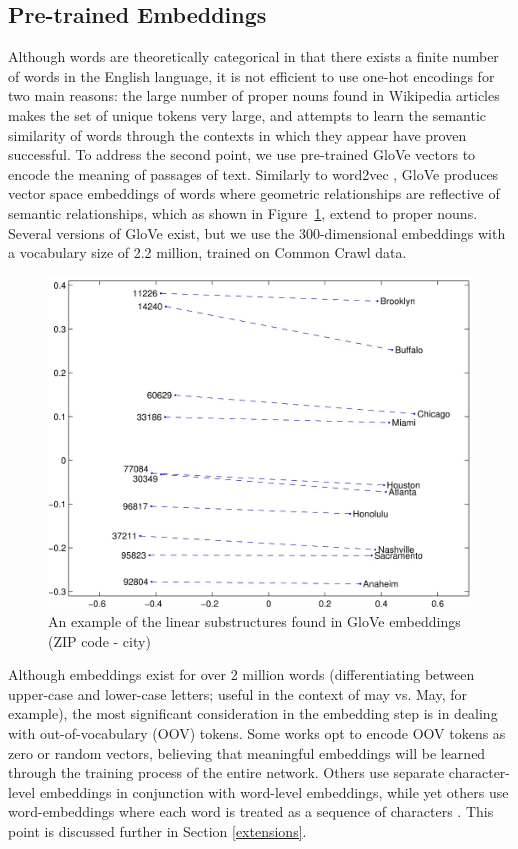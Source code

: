 \documentclass{article}
\begin{document}
\subsection{Pre-trained Embeddings}
Although words are theoretically categorical in that there exists a finite number of words in the English language, it is not efficient to use one-hot encodings for two main reasons: the large number of proper nouns found in Wikipedia articles makes the set of unique tokens very large, and attempts to learn the semantic similarity of words through the contexts in which they appear have proven successful. To address the second point, we use pre-trained GloVe \cite{GloVe} vectors to encode the meaning of passages of text. Similarly to word2vec \cite{word2vec}, GloVe produces vector space embeddings of words where geometric relationships are reflective of semantic relationships, which as shown in Figure~\ref{fig:gloveExample}, extend to proper nouns. Several versions of GloVe exist, but we use the 300-dimensional embeddings with a vocabulary size of 2.2 million, trained on Common Crawl data.

\begin{figure}[h]
	\includegraphics[width=0.36	\textwidth]{glove.jpg}
	\centering
	\caption{An example of the linear substructures found in GloVe embeddings (ZIP code - city)}
	\label{fig:gloveExample}
\end{figure} 

Although embeddings exist for over 2 million words (differentiating between upper-case and lower-case letters; useful in the context of may vs. May, for example), the most significant consideration in the embedding step is in dealing with out-of-vocabulary (OOV) tokens. Some works opt to encode OOV tokens as zero or random vectors, believing that meaningful embeddings will be learned through the training process of the entire network. Others use separate character-level embeddings in conjunction with word-level embeddings, while yet others use word-embeddings where each word is treated as a sequence of characters \cite{ELMo}. This point is discussed further in Section \ref{extensions}.
\end{document}
